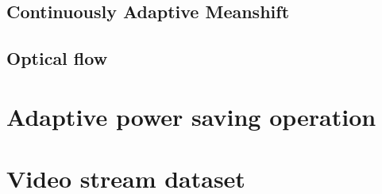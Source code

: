 \subsection{Continuously Adaptive Meanshift}

\subsection{Optical flow}

\section{Adaptive power saving operation}

\section{Video stream dataset}
